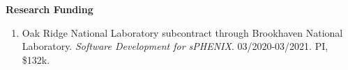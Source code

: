 \documentclass[11pt]{article}
\begin{document}
\vspace{7pt}

\begin{flushleft}
	\Large\textbf{Research Funding}
	\vspace{4pt}
	\normalsize
	\begin{center}
		\begin{enumerate}
			\item Oak Ridge National Laboratory subcontract through Brookhaven National Laboratory. \textit{Software Development for sPHENIX}. 03/2020-03/2021. PI, \$132k.
		\end{enumerate}
	\end{center}
\end{flushleft}


\vspace{7pt}
\end{document}
